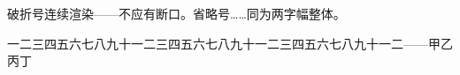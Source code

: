 \documentclass{ltc-tw-vbook}
\begin{document}
\begin{正文}

破折号连续渲染——不应有断口。省略号……同为两字幅整体。

一二三四五六七八九十一二三四五六七八九十一二三四五六七八九十一二——甲乙丙丁

\end{正文}
\end{document}
